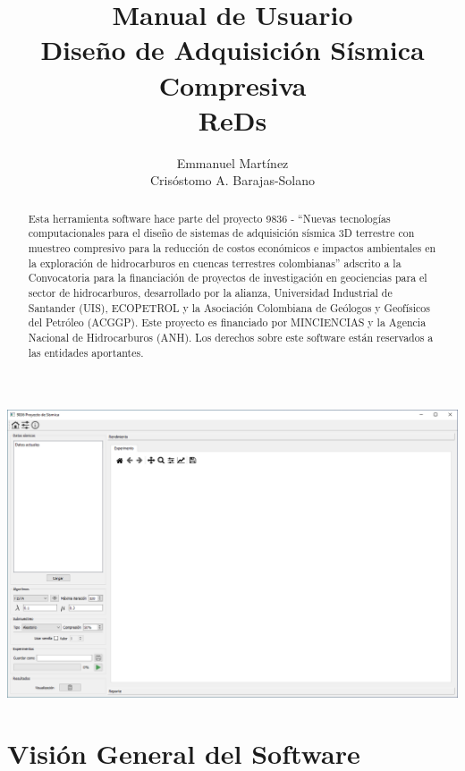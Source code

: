 \documentclass[12pt,oneside,a4]{ol-softwaremanual}
\title{\vspace{20mm} \large{Manual de Usuario}\\ \vspace{10mm} \huge{Diseño de Adquisición Sísmica Compresiva}\\ \vspace{5mm} \huge{ReDs}}
\author{Emmanuel Martínez \\ Crisóstomo A. Barajas-Solano}
\begin{document}
\maketitle
\begin{center}
\includegraphics[width=.9\linewidth]{header.png}
\end{center}
\begin{abstract}
Esta herramienta software hace parte del proyecto 9836 - ``Nuevas tecnologías computacionales para el diseño de sistemas de adquisición sísmica 3D terrestre con muestreo compresivo para la reducción de costos económicos e impactos ambientales en la exploración de hidrocarburos en cuencas terrestres colombianas'' adscrito a la Convocatoria para la financiación de proyectos de investigación en geociencias para el sector de hidrocarburos, desarrollado por la alianza, Universidad Industrial de Santander (UIS), ECOPETROL y la Asociación Colombiana de Geólogos y Geofísicos del Petróleo (ACGGP). Este proyecto es financiado por MINCIENCIAS y la Agencia Nacional de Hidrocarburos (ANH). Los derechos sobre este software están reservados a las entidades aportantes.
\end{abstract}

\clearpage
\tableofcontents

\clearpage

\section{Visión General del Software}
\end{document}
